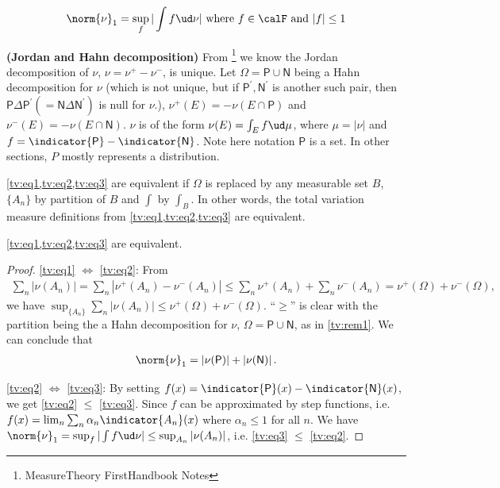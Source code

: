 \documentclass{article}
\newcommand{\one}[1]{\norm{#1}_{1}}
\newcommand{\bfs}[1]{\textbf{({#1})}}
\begin{document}
\begin{defa}{}
\begin{align}
\one{\nu} = \sup_{f}|\int f \ud \nu| \text{ where } f\in \calF \text{ and } |f|\le 1 \label{tv:eq3}
\end{align}
\end{defa}
\begin{rema}{\bfs{Jordan and Hahn decomposition}}\label{tv:rem1}
From \footnote{MeasureTheory FirstHandbook Notes} we know the Jordan decomposition of $\nu$, $\nu=\nu^{+}-\nu^{-}$, is unique.  Let $\Omega=\mathsf{P} \cup \mathsf{N}$ being a Hahn decomposition for $\nu$ (which is not unique, but if $\mathsf{P}^{\prime}, \mathsf{N}^{\prime}$ is another such pair, then $\mathsf{P} \Delta \mathsf{P}^{\prime}\left(=\mathsf{N} \Delta \mathsf{N}^{\prime}\right)$ is null for $\nu$.), $\nu^{+}(E)=-\nu(E \cap \mathsf{P})$ and $\nu^{-}(E)=-\nu(E \cap \mathsf{N})$. $\nu$ is of the form $\nu(E)=\int_{E} f \ud \mu$, where $\mu=|\nu|$ and $f=\indicator{\mathsf{P}}-\indicator{\mathsf{N}}$. Note here notation $\mathsf{P}$ is a set. In other sections, ${P}$ mostly represents a distribution.

\cref{tv:eq1,tv:eq2,tv:eq3} are equivalent if $\Omega$ is replaced by any measurable set $B$,  ${\{A_n\}}$ by partition of $B$ and $\int$ by $\int_B$. In other words, the total variation measure definitions from \cref{tv:eq1,tv:eq2,tv:eq3} are equivalent.
\end{rema}


\begin{thma}
\cref{tv:eq1,tv:eq2,tv:eq3} are equivalent.
\end{thma}


\begin{proof}
\cref{tv:eq1} $\Leftrightarrow$ \cref{tv:eq2}: From 
\begin{align*}
\sum_{n} \left|\nu\left(A_{n}\right)\right| =\sum_{n} \left|\nu^{+}\left(A_{n}\right)-\nu^{-}\left(A_{n}\right) \right|\le\sum_{n} \nu^{+}\left(A_{n}\right)+\sum_{n} \nu^{-}\left(A_{n}\right)=\nu^{+}(\Omega)+\nu^{-}(\Omega), 
\end{align*}
we have $\sup_{\{A_n\}} \sum_{n} \left|\nu\left(A_{n}\right)\right| \le \nu^{+}(\Omega)+\nu^{-}(\Omega)$. ``$\ge$'' is clear with the partition being  the a Hahn decomposition for $\nu$, $\Omega=\mathsf{P} \cup \mathsf{N}$, as in \cref{tv:rem1}. We can conclude that \begin{align}
    \one{\nu}  = \left| \nu(\mathsf{P})\right| + \left| \nu(\mathsf{N})\right|. \label{tv:eq4}
\end{align}

\cref{tv:eq2} $\Leftrightarrow$ \cref{tv:eq3}:
By setting $f(x)=\indicator{\mathsf{P}}(x)-\indicator{\mathsf{N}}(x)$, we get \cref{tv:eq2} $\le$ \cref{tv:eq3}. Since $f$ can be approximated by step functions, i.e. $f(x)= \lim_n \sum_{n}\alpha_n\indicator{A_n}(x)$ where $\alpha_n\le 1$ for all $n$. We have $\one{\nu} = \sup_{f}|\int f \ud \nu|\le \sup_{A_n}| \nu (A_n)|$, i.e. \cref{tv:eq3} $\le$ \cref{tv:eq2}.
\end{proof}
\end{document}
